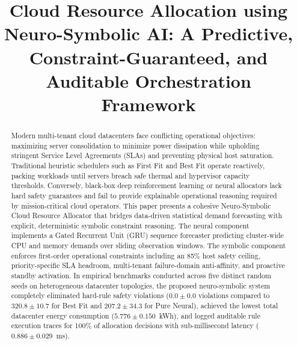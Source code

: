 \documentclass[conference]{IEEEtran}
\begin{document}
\twocolumn

\title{Cloud Resource Allocation using Neuro-Symbolic AI: A Predictive, Constraint-Guaranteed, and Auditable Orchestration Framework}

\author{
\and
{}
\and
{}
}

\maketitle

\begin{abstract}
Modern multi-tenant cloud datacenters face conflicting operational objectives: maximizing server consolidation to minimize power dissipation while upholding stringent Service Level Agreements (SLAs) and preventing physical host saturation. Traditional heuristic schedulers such as First Fit and Best Fit operate reactively, packing workloads until servers breach safe thermal and hypervisor capacity thresholds. Conversely, black-box deep reinforcement learning or neural allocators lack hard safety guarantees and fail to provide explainable operational reasoning required by mission-critical cloud operators. This paper presents a cohesive Neuro-Symbolic Cloud Resource Allocator that bridges data-driven statistical demand forecasting with explicit, deterministic symbolic constraint reasoning. The neural component implements a Gated Recurrent Unit (GRU) sequence forecaster predicting cluster-wide CPU and memory demands over sliding observation windows. The symbolic component enforces first-order operational constraints including an 85\% host safety ceiling, priority-specific SLA headroom, multi-tenant failure-domain anti-affinity, and proactive standby activation. In empirical benchmarks conducted across five distinct random seeds on heterogeneous datacenter topologies, the proposed neuro-symbolic system completely eliminated hard-rule safety violations ($0.0 \pm 0.0$ violations compared to $320.8 \pm 10.7$ for Best Fit and $207.2 \pm 34.3$ for Pure Neural), achieved the lowest total datacenter energy consumption ($5.776 \pm 0.150$~kWh), and logged auditable rule execution traces for 100\% of allocation decisions with sub-millisecond latency ($0.886 \pm 0.029$~ms).
\end{abstract}
\end{document}
